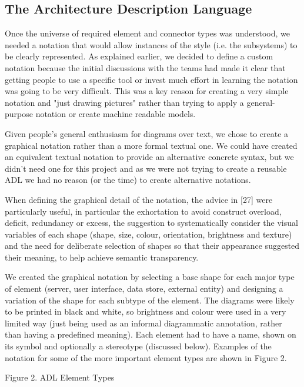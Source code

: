 \begin{itemise}
\subsection{The Architecture Description Language}

  Once the universe of required element and connector types was understood, we needed a notation that would allow instances of the style (i.e. the subsystems) to be clearly represented.  As explained earlier, we decided to define a custom notation because the initial discussions with the teams had made it clear that getting people to use a specific tool or invest much effort in learning the notation was going to be very difficult. This was a key reason for creating a very simple notation and "just drawing pictures" rather than trying to apply a general-purpose notation or create machine readable models.

  Given people's general enthusiasm for diagrams over text, we chose to create a graphical notation rather than a more formal textual one. We could have created an equivalent textual notation to provide an alternative concrete syntax, but we didn't need one for this project and as we were not trying to create a reusable ADL we had no reason (or the time) to create alternative notations.

  When defining the graphical detail of the notation, the advice in [27] were particularly useful, in particular the exhortation to avoid construct overload, deficit, redundancy or excess, the suggestion to systematically consider the visual variables of each shape (shape, size, colour, orientation, brightness and texture) and the need for deliberate selection of shapes so that their appearance suggested their meaning, to help achieve semantic transparency.

  We created the graphical notation by selecting a base shape for each major type of element (server, user interface, data store, external entity) and designing a variation of the shape for each subtype of the element.  The diagrams were likely to be printed in black and white, so brightness and colour were used in a very limited way (just being used as an informal diagrammatic annotation, rather than having a predefined meaning).  Each element had to have a name, shown on its symbol and optionally a stereotype (discussed below).  Examples of the notation for some of the more important element types are shown in Figure 2. 

  

Figure 2.  ADL Element Types


\end{itemise}

